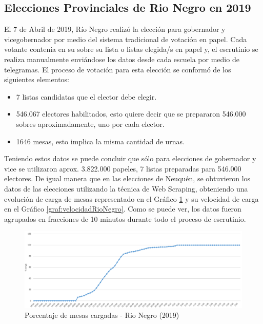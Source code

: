 \subsection{Elecciones Provinciales de Rio Negro en 2019}
El 7 de Abril de 2019, Río Negro realizó la elección para gobernador y vicegobernador por medio del sistema tradicional de votación en papel. Cada votante contenia en su sobre su lista o listas elegida/s en papel y, el escrutinio se realiza manualmente enviándose los datos desde cada escuela por medio de telegramas. El proceso de votación para esta elección se conformó de los siguientes elementos:
\begin{itemize}
    \item 7 listas candidatas que el elector debe elegir.
    \item 546.067 electores habilitados, esto quiere decir que se prepararon 546.000 sobres aproximadamente, uno por cada elector.
    \item 1646 mesas, esto implica la misma cantidad de urnas.
\end{itemize}
Teniendo estos datos se puede concluir que sólo para elecciones de gobernador y vice se utilizaron aprox. 3.822.000 papeles, 7 listas preparadas para 546.000 electores. \newline
De igual manera que en las elecciones de Neuquén, se obtuvieron los datos de las elecciones utilizando la técnica de Web Scraping, obteniendo una evolución de carga de mesas representado en el Gráfico \ref{graf:porcentajeRioNegro} y su velocidad de carga en el Gráfico \ref{graf:velocidadRioNegro}. Como se puede ver, los datos fueron agrupados en fracciones de 10 minutos durante todo el proceso de escrutinio.


\begin{figure}[h!]
  \includegraphics[width=1\textwidth]{img/sAveHlGEkX.png}
  \caption{Porcentaje de mesas cargadas - Rio Negro (2019)}
  \label{graf:porcentajeRioNegro}
\end{figure}

